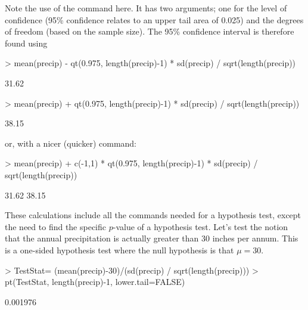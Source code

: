 Note the use of the  command here. It has two arguments; one for the level of confidence (95\% confidence relates to an upper tail area of 0.025) and the degrees of freedom (based on the sample size). The 95\% confidence interval is therefore found using 

\begin{Schunk}
\begin{Sinput}
> mean(precip) - qt(0.975, length(precip)-1) * sd(precip) / sqrt(length(precip)) 
\end{Sinput}
\begin{Soutput}
[1] 31.62
\end{Soutput}
\begin{Sinput}
> mean(precip) + qt(0.975, length(precip)-1) * sd(precip) / sqrt(length(precip)) 
\end{Sinput}
\begin{Soutput}
[1] 38.15
\end{Soutput}
\end{Schunk}

or, with a nicer (quicker) command: 

\begin{Schunk}
\begin{Sinput}
> mean(precip) + c(-1,1) * qt(0.975, length(precip)-1) * sd(precip) / sqrt(length(precip)) 
\end{Sinput}
\begin{Soutput}
[1] 31.62 38.15
\end{Soutput}
\end{Schunk}

These calculations include all the commands needed for a hypothesis test, except the need to find the specific $p$-value of a hypothesis test. Let's test the notion that the annual precipitation is actually greater than 30 inches per annum. This is a one-sided hypothesis test where the null hypothesis is that $\mu=30$. 

\begin{Schunk}
\begin{Sinput}
> TestStat= (mean(precip)-30)/(sd(precip) / sqrt(length(precip))) 
> pt(TestStat, length(precip)-1, lower.tail=FALSE) 
\end{Sinput}
\begin{Soutput}
[1] 0.001976
\end{Soutput}
\end{Schunk}

